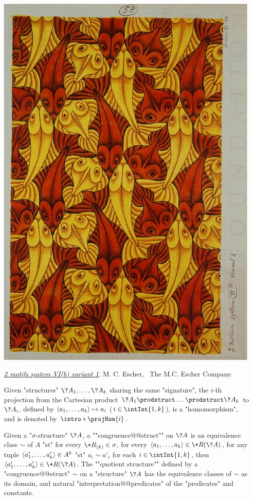 \begin{marginfigure}
	\centering
	\includegraphics[width=\linewidth]{fig/escher/2-motifs-system.jpg}
	\caption{\href{https://mcescher.com/gallery/symmetry/\#iLightbox[gallery\_image_1]/44}{\emph{2 motifs system VI(b) variant 1}}, M. C. Escher, \textcopyright~The M.C. Escher Company.}
\end{marginfigure}
Given "structures" $\?A_1, \dotsc, \?A_k$ sharing the same "signature",
the $i$-th projection from the Cartesian product $\?A_1 \prodstruct \dotsc \prodstruct \?A_k$
to $\?A_i$, defined by $\langle a_1,\dotsc,a_k\rangle \mapsto a_i$ ($i \in \intInt{1,k}$),
is a "homomorphism", and is denoted by \AP$\intro*\projHom{i}$.

Given a "$\sigma$-structure" $\?A$, a \AP""congruence@@struct"" on $\?A$
is an equivalence class $\sim$ of $A$ "st" for every
$\+R_{(k)} \in \sigma$, for every $\tup{a_1,\dotsc,a_k} \in \+R(\?A)$,
for any tuple $\langle a'_1,\dotsc,a'_k\rangle \in A^k$ "st" $a_i \sim a'_i$ for each $i\in \intInt{1,k}$,
then $\tup{a'_1,\dotsc,a'_k} \in \+R(\?A)$.
The \AP""quotient structure"" defined by a "congruence@@struct" $\sim$
on a "structure" $\?A$ has the equivalence classes of $\sim$ as its domain,
and natural "interpretation@@predicates" of the "predicates" and constants.

